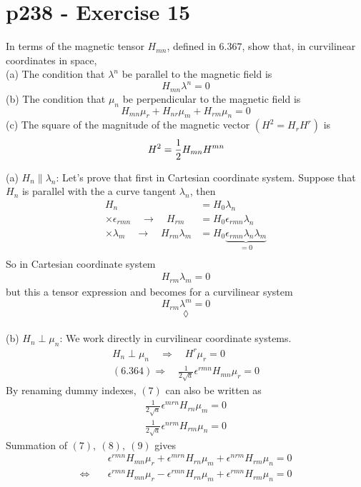 \section{p238 - Exercise 15}
\begin{tcolorbox}
In terms of the magnetic tensor $H_{mn}$, defined in $\mathbf{6.367}$, show that, in curvilinear coordinates in space,\\
(a) The condition that $\lambda^n$ be parallel to the magnetic field is 
$$H_{mn}\lambda^n=0$$
(b) The condition that $\mu_n$ be perpendicular to the magnetic field is 
$$H_{mn}\mu_r+H_{nr}\mu_m+H_{rm}\mu_n=0$$
(c) The square of the magnitude of the magnetic vector $\left(H^2=H_rH^r\right)$ is 
$$H^2= \frac{1}{2} H_{mn}H^{mn}$$
\end{tcolorbox}

(a) $H_n \parallel \lambda_n$: Let's prove that first in Cartesian coordinate system.
Suppose that $H_n$ is parallel with the a curve tangent $\lambda_n$, then
\begin{align}
H_n&= H_0\lambda_n\\
\times \epsilon_{rmn}\quad\rightarrow \quad H_{rm}&= H_0\epsilon_{rmn}\lambda_n\\
\times \lambda_m\quad\rightarrow \quad H_{rm}\lambda_m&= H_0\underbrace{\epsilon_{rmn}\lambda_n\lambda_m}_{=0}\\
\end{align}
So in Cartesian coordinate system 
\begin{align}
H_{rm}\lambda_m=0
\end{align}
but this a tensor expression and becomes for a curvilinear system
$$H_{rm}\lambda^m=0$$
$$\lozenge$$
\\
(b) $H_n \perp \mu_n$:
We work directly in curvilinear coordinate systems.
\begin{align}
H_n \perp \mu_n\quad\Rightarrow\quad H^r\mu_r =  0\\
\mathbf{(6.364)}\Rightarrow\quad \frac{1}{2\sqrt{a}}\epsilon^{rmn}H_{mn}\mu_r =  0
\end{align}
By renaming dummy indexes, $(7)$ can also be written as 
\begin{align}
\frac{1}{2\sqrt{a}}\epsilon^{mrn}H_{rn}\mu_m =  0\\
\frac{1}{2\sqrt{a}}\epsilon^{nrm}H_{rm}\mu_n =  0
\end{align}
Summation of $(7), \ (8),\ (9)$ gives
\begin{align}
&\epsilon^{rmn}H_{mn}\mu_r+\epsilon^{mrn}H_{rn}\mu_m+ \epsilon^{nrm}H_{rm}\mu_n =  0\\
\Leftrightarrow\quad &\epsilon^{rmn}H_{mn}\mu_r-\epsilon^{rmn}H_{rn}\mu_m+ \epsilon^{rmn}H_{rm}\mu_n =  0\\
\end{align}

